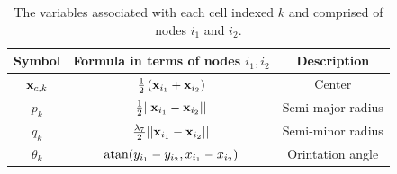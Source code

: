 \begin{table}[!htb]
\begin{center}
    \begin{tabular}{ |c|c|c| } 
     \hline
      \textbf{Symbol} & \textbf{Formula in terms of nodes $i_1, i_2$} & \textbf{Description} \\ 
      \hline
     $\vb{x}_{c,k}$ & $\frac{1}{2} \left(\vb{x}_{i_1} + \vb{x}_{i_2}\right)$     & Center \\ 
     $p_k$          & $\frac{1}{2}||\vb{x}_{i_1} - \vb{x}_{i_2}||$                     & Semi-major radius \\ 
     $q_k$          & $\frac{\lambda_7}{2}||\vb{x}_{i_1} - \vb{x}_{i_2}||$                                      & Semi-minor radius \\         
     $\theta_k$     & $\atan (y_{i_1} - y_{i_2},x_{i_1} - x_{i_2} )$                   & Orintation angle \\         
     \hline   
    \end{tabular}   
\end{center}
\caption{The variables associated with each cell indexed $k$ and comprised of 
         nodes $i_1$ and $i_2$.}
\label{table:perCellVariables}
\end{table}

